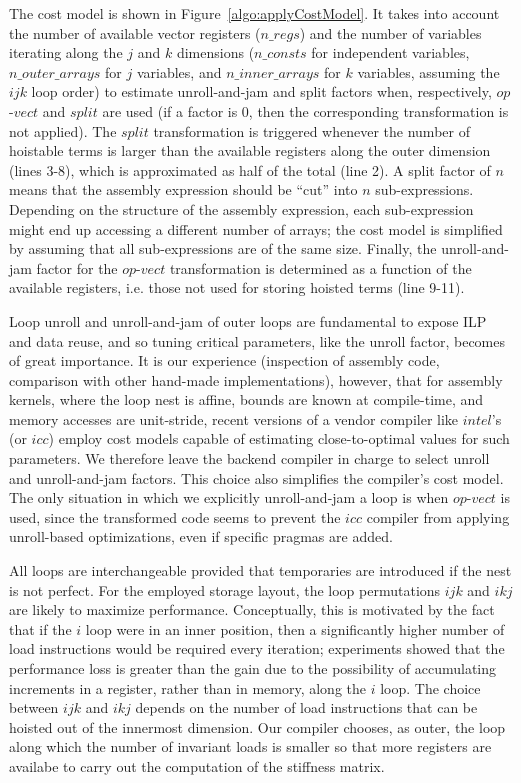 \documentclass[conference]{IEEEtran}
\begin{document}
The cost model is shown in Figure~\ref{algo:applyCostModel}. It takes into account the number of available vector registers ($n\_regs$) and the number of variables iterating along the $j$ and $k$ dimensions ($n\_consts$ for independent variables, $n\_outer\_arrays$ for $j$ variables, and $n\_inner\_arrays$ for $k$ variables, assuming the $ijk$ loop order) to estimate unroll-and-jam and split factors when, respectively, $op$-$vect$ and $split$ are used (if a factor is 0, then the corresponding transformation is not applied). The $split$ transformation is triggered whenever the number of hoistable terms is larger than the available registers along the outer dimension (lines 3-8), which is approximated as half of the total (line 2). A split factor of $n$ means that the assembly expression should be ``cut'' into $n$ sub-expressions. Depending on the structure of the assembly expression, each sub-expression might end up accessing a different number of arrays; the cost model is simplified by assuming that all sub-expressions are of the same size. Finally, the unroll-and-jam factor for the $op$-$vect$ transformation is determined as a function of the available registers, i.e. those not used for storing hoisted terms (line 9-11). 

Loop unroll and unroll-and-jam of outer loops are fundamental to expose ILP and data reuse, and so tuning critical parameters, like the unroll factor, becomes of great importance. It is our experience (inspection of assembly code, comparison with other hand-made implementations), however, that for assembly kernels, where the loop nest is affine, bounds are known at compile-time, and memory accesses are unit-stride, recent versions of a vendor compiler like $intel$'s (or $icc$) employ cost models capable of estimating close-to-optimal values for such parameters.  We therefore leave the backend compiler in charge to select unroll and unroll-and-jam factors. This choice also simplifies the compiler's cost model. The only situation in which we explicitly unroll-and-jam a loop is when $op$-$vect$ is used, since the transformed code seems to prevent the $icc$ compiler from applying unroll-based optimizations, even if specific pragmas are added.

All loops are interchangeable provided that temporaries are introduced if the nest is not perfect. For the employed storage layout, the loop permutations $ijk$ and $ikj$ are likely to maximize performance. Conceptually, this is motivated by the fact that if the $i$ loop were in an inner position, then a significantly higher number of load instructions would be required every iteration; experiments showed that the performance loss is greater than the gain due to the possibility of accumulating increments in a register, rather than in memory, along the $i$ loop. The choice between $ijk$ and $ikj$ depends on the number of load instructions that can be hoisted out of the innermost dimension. Our compiler chooses, as outer, the loop along which the number of invariant loads is smaller so that more registers are availabe to carry out the computation of the stiffness matrix. 
\end{document}
